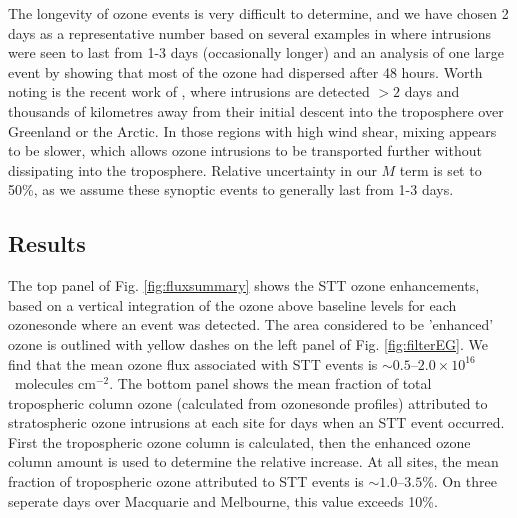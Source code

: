 \documentclass[acp, manuscript]{copernicus} %
\begin{document}
    The longevity of ozone events is very difficult to determine, and we have chosen 2 days as a representative number based on several examples in \cite{Lin2012} where intrusions were seen to last from 1-3 days (occasionally longer) and an analysis of one large event by \cite{Cooper2004} showing that most of the ozone had dispersed after 48 hours.
    Worth noting is the recent work of \cite{Trickl2014}, where intrusions are detected $>2$ days and thousands of kilometres away from their initial descent into the troposphere over Greenland or the Arctic.
    In those regions with high wind shear, mixing appears to be slower, which allows ozone intrusions to be transported further without dissipating into the troposphere.
    Relative uncertainty in our $M$ term is set to 50\%, as we assume these synoptic events to generally last from 1-3 days.
    
  \subsection{Results}
  
    The top panel of Fig. \ref{fig:fluxsummary} shows the STT ozone enhancements, based on a vertical integration of the ozone above baseline levels for each ozonesonde where an event was detected.
    The area considered to be 'enhanced' ozone is outlined with yellow dashes on the left panel of Fig. \ref{fig:filterEG}.
    We find that the mean ozone flux associated with STT events is $\sim 0.5$--$2.0 \times 10^{16}$~molecules cm$^{-2}$.
    The bottom panel shows the mean fraction of total tropospheric column ozone (calculated from ozonesonde profiles) attributed to stratospheric ozone intrusions at each site for days when an STT event occurred.
    First the tropospheric ozone column is calculated, then the enhanced ozone column amount is used to determine the relative increase.
    At all sites, the mean fraction of tropospheric ozone attributed to STT events is $\sim 1.0$--$3.5\%$.
    On three seperate days over Macquarie and Melbourne, this value exceeds 10\%.
    
\end{document}
